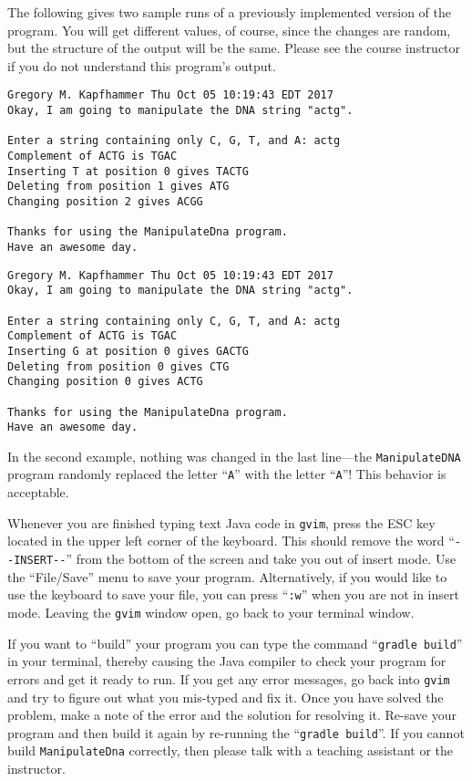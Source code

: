 \documentclass[11pt]{article}
\newcommand{\mainprogram}{\lstinline{ManipulateDna}}
\newcommand{\gradlebuild}{\command{gradle build}}
\newcommand{\command}[1]{``\lstinline{#1}''}
\newcommand{\program}[1]{\lstinline{#1}}
\newcommand{\option}[1]{``{#1}''}
\newcommand{\step}[1]{``{#1}''}
\begin{document}
The following gives two sample runs of a previously implemented version of the program. You will get different values,
of course, since the changes are random, but the structure of the output will be the same. Please see the course
instructor if you do not understand this program's output.

\begin{verbatim}
Gregory M. Kapfhammer Thu Oct 05 10:19:43 EDT 2017
Okay, I am going to manipulate the DNA string "actg".

Enter a string containing only C, G, T, and A: actg
Complement of ACTG is TGAC
Inserting T at position 0 gives TACTG
Deleting from position 1 gives ATG
Changing position 2 gives ACGG

Thanks for using the ManipulateDna program.
Have an awesome day.
\end{verbatim}

\begin{verbatim}
Gregory M. Kapfhammer Thu Oct 05 10:19:43 EDT 2017
Okay, I am going to manipulate the DNA string "actg".

Enter a string containing only C, G, T, and A: actg
Complement of ACTG is TGAC
Inserting G at position 0 gives GACTG
Deleting from position 0 gives CTG
Changing position 0 gives ACTG

Thanks for using the ManipulateDna program.
Have an awesome day.
\end{verbatim}

In the second example, nothing was changed in the last line---the {\tt ManipulateDNA} program randomly replaced the
letter ``{\tt A}'' with the letter ``{\tt A}''!  This behavior is acceptable.


Whenever you are finished typing text Java code in \program{gvim}, press the ESC key located in the upper left corner of
the keyboard. This should remove the word \command{--INSERT--} from the bottom of the screen and take you out of insert
mode. Use the \option{File/Save} menu to save your program. Alternatively, if you would like to use the keyboard to save
your file, you can press \command{:w} when you are not in insert mode. Leaving the {\tt gvim} window open, go back to
your terminal window.

If you want to \step{build} your program you can type the command \gradlebuild{} in your terminal, thereby causing the
Java compiler to check your program for errors and get it ready to run. If you get any error messages, go back into
\program{gvim} and try to figure out what you mis-typed and fix it. Once you have solved the problem, make a note of the
error and the solution for resolving it. Re-save your program and then build it again by re-running the \gradlebuild{}.
If you cannot build \mainprogram{} correctly, then please talk with a teaching assistant or the instructor.
\end{document}
